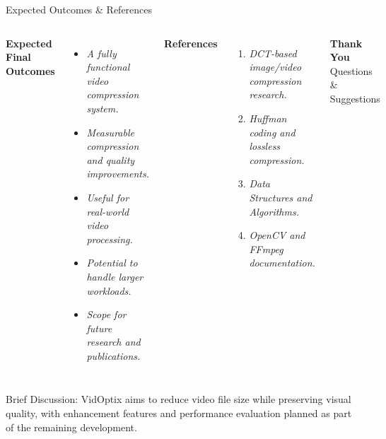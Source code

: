 \documentclass[aspectratio=169,11pt]{beamer}
\newcommand{\smallnote}[1]{%
\vspace{0.08cm}
{\scriptsize\color{GEUGrey}#1}
}
\newcommand{\placeholder}[1]{%
\textit{\color{GEUGrey}#1}
}
\begin{document}
\begin{frame}{Expected Outcomes \& References}
\small

\begin{columns}[T,totalwidth=\textwidth]


\textbf{\color{GEUBlue}Expected Final Outcomes}

\begin{itemize}\itemsep-2pt
\item \placeholder{A fully functional video compression system.}
\item \placeholder{Measurable compression and quality improvements.}
\item \placeholder{Useful for real-world video processing.}
\item \placeholder{Potential to handle larger workloads.}
\item \placeholder{Scope for future research and publications.}
\end{itemize}


\textbf{\color{GEUBlue}References}

\begin{enumerate}\itemsep-2pt
\item \placeholder{DCT-based image/video compression research.}
\item \placeholder{Huffman coding and lossless compression.}
\item \placeholder{Data Structures and Algorithms.}
\item \placeholder{OpenCV and FFmpeg documentation.}
\end{enumerate}

\begin{center}

\colorbox{GEUBlue}{
\parbox{.78\textwidth}{
\centering
\color{white}
\textbf{Thank You}\\
Questions \& Suggestions
}}

\end{center}

\end{columns}

\smallnote{
Brief Discussion: VidOptix aims to reduce video file size while preserving visual quality, with enhancement features and performance evaluation planned as part of the remaining development.
}

\end{frame}
\end{document}
